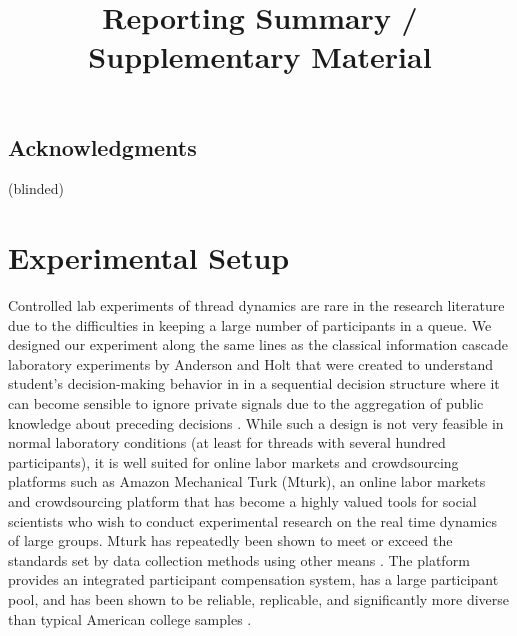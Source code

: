 \documentclass[9pt,a4paper,twocolumn,lineno]{article}
\begin{document}
\subsection*{Acknowledgments}  \small (blinded)%




\newpage
\appendix
\onecolumn

\title{\Huge Reporting Summary / Supplementary Material}


\section*{Experimental Setup}
Controlled lab experiments of thread dynamics are rare in the research literature due to the difficulties in keeping a large number of participants in a queue. We designed our experiment along the same lines as the classical information cascade laboratory experiments by Anderson and Holt  that were created to understand student's decision-making behavior in in a sequential decision structure where it can become sensible to ignore private signals due to the aggregation of public knowledge about preceding decisions \cite{anderson1997information}. While such a design is not very feasible in normal laboratory conditions (at least for threads with several hundred participants), it is well suited for online labor markets and crowdsourcing platforms such as Amazon Mechanical Turk (Mturk), an online labor markets and crowdsourcing platform that has become a highly valued tools for social scientists who wish to conduct experimental research on the real time dynamics of large groups. Mturk has repeatedly been shown to meet or exceed the standards set by data collection methods using other means \cite{berinsky2012evaluating, buhrmester2018evaluation}. The platform provides an integrated participant compensation system, has a large participant pool, and has been shown to be reliable, replicable, and significantly more diverse than typical American college samples \cite{mason2009financial, buhrmester2011amazon, crump2013evaluating, rand2012promise, horton2011online}.
\end{document}
